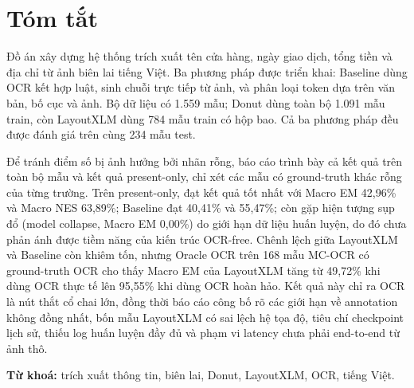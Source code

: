 
\section*{Tóm tắt}

Đồ án xây dựng hệ thống trích xuất tên cửa hàng, ngày giao dịch, tổng tiền và địa chỉ từ ảnh biên lai tiếng Việt. Ba phương pháp được triển khai: Baseline dùng OCR kết hợp luật,  sinh chuỗi trực tiếp từ ảnh, và  phân loại token dựa trên văn bản, bố cục và ảnh. Bộ dữ liệu có 1.559 mẫu; Donut dùng toàn bộ 1.091 mẫu train, còn LayoutXLM dùng 784 mẫu train có hộp bao. Cả ba phương pháp đều được đánh giá trên cùng 234 mẫu test.

Để tránh điểm số bị ảnh hưởng bởi nhãn rỗng, báo cáo trình bày cả kết quả trên toàn bộ mẫu và kết quả present-only, chỉ xét các mẫu có ground-truth khác rỗng của từng trường. Trên present-only,  đạt kết quả tốt nhất với Macro EM 42,96\% và Macro NES 63,89\%; Baseline đạt 40,41\% và 55,47\%; còn  gặp hiện tượng sụp đổ (model collapse, Macro EM 0,00\%) do giới hạn dữ liệu huấn luyện, do đó chưa phản ánh được tiềm năng của kiến trúc OCR-free. Chênh lệch giữa LayoutXLM và Baseline còn khiêm tốn, nhưng Oracle OCR trên 168 mẫu MC-OCR có ground-truth OCR cho thấy Macro EM của LayoutXLM tăng từ 49,72\% khi dùng OCR thực tế lên 95,55\% khi dùng OCR hoàn hảo. Kết quả này chỉ ra OCR là nút thắt cổ chai lớn, đồng thời báo cáo công bố rõ các giới hạn về annotation không đồng nhất, bốn mẫu LayoutXLM có sai lệch hệ tọa độ, tiêu chí checkpoint lịch sử, thiếu log huấn luyện đầy đủ và phạm vi latency chưa phải end-to-end từ ảnh thô.

\vspace{1em}
\noindent\textbf{Từ khoá:} trích xuất thông tin, biên lai, Donut, LayoutXLM, OCR, tiếng Việt.
